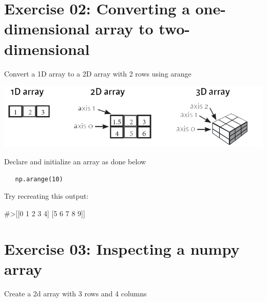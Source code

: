 \documentclass{42-en}
\begin{document}


\chapter{Exercise 02: Converting a one-dimensional array to two-dimensional}

\makeheaderfiles
\vspace{1em}
Convert a 1D array to a 2D array with 2 rows using arange 
\vspace{0.8em}

\includegraphics[width=150mm]{images/content_arrays-axes.png}

\vspace{0.8em}

Declare and initialize an array as done below
\vspace{1em}

\begin{lstlisting}
   np.arange(10)
\end{lstlisting}

\vspace{1em}

Try recreating this output:\linebreak
\begin{42console}
#>[[0 1 2 3 4]
   [5 6 7 8 9]]
\end{42console}

\nextexercice
\newpage



\chapter{Exercise 03:  Inspecting a numpy array}
\makeheaderfiles
\vspace{1em}
Create a 2d array with 3 rows and 4 columns
\vspace{1em}
\end{document}

